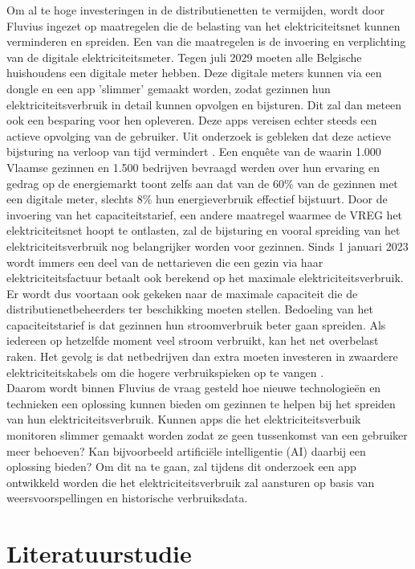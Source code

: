 \documentclass{hogent-article}
\begin{document}
Om al te hoge investeringen in de distributienetten te vermijden, wordt door Fluvius ingezet op maatregelen die de belasting van het elektriciteitsnet kunnen verminderen en spreiden. Een van die maatregelen is de invoering en verplichting van de digitale elektriciteitsmeter. Tegen juli 2029 moeten alle Belgische huishoudens een digitale meter hebben. Deze digitale meters kunnen via een dongle en een app 'slimmer' gemaakt worden, zodat gezinnen hun elektriciteitsverbruik in detail kunnen opvolgen en bijsturen. Dit zal dan meteen ook een besparing voor hen opleveren. Deze apps vereisen echter steeds een actieve opvolging van de gebruiker. Uit onderzoek is gebleken dat deze actieve bijsturing na verloop van tijd vermindert \autocite{Wemyss2019}. Een enquête van de \textcite{VREG2021} waarin 1.000 Vlaamse gezinnen en 1.500 bedrijven bevraagd werden over hun ervaring en gedrag op de energiemarkt toont zelfs aan dat van de 60\% van de gezinnen met een digitale meter, slechts 8\% hun energieverbruik effectief bijstuurt. Door de invoering van het capaciteitstarief, een andere maatregel waarmee de VREG het elektriciteitsnet hoopt te ontlasten, zal de bijsturing en vooral spreiding van het elektriciteitsverbruik nog belangrijker worden voor gezinnen. Sinds 1 januari 2023 wordt immers een deel van de nettarieven die een gezin via haar elektriciteitsfactuur betaalt ook berekend op het maximale elektriciteitsverbruik. Er wordt dus voortaan ook gekeken naar de maximale capaciteit die de distributienetbeheerders ter beschikking moeten stellen. Bedoeling van het capaciteitstarief is dat gezinnen hun stroomverbruik beter gaan spreiden. Als iedereen op hetzelfde moment veel stroom verbruikt, kan het net overbelast raken. Het gevolg is dat netbedrijven dan extra moeten investeren in zwaardere elektriciteitskabels om die hogere verbruikspieken op te vangen \autocite{Selleslagh2022}. \\

Daarom wordt binnen Fluvius de vraag gesteld hoe nieuwe technologieën en technieken een oplossing kunnen bieden om gezinnen te helpen bij het spreiden van hun elektriciteitsverbruik. Kunnen apps die het elektriciteitsverbuik monitoren slimmer gemaakt worden zodat ze geen tussenkomst van een gebruiker meer behoeven? Kan bijvoorbeeld artificiële intelligentie (AI) daarbij een oplossing bieden? Om dit na te gaan, zal tijdens dit onderzoek een app ontwikkeld worden die het elektriciteitsverbruik zal aansturen op basis van weersvoorspellingen en historische verbruiksdata.

\section{Literatuurstudie}%
\label{sec:literatuurstudie}
\end{document}
